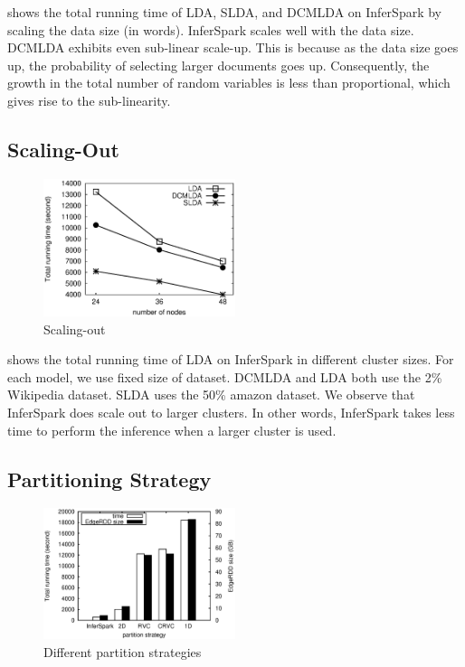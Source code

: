  shows the total running time of LDA, SLDA, and DCMLDA on InferSpark
by scaling the data size (in words).
InferSpark scales well with the data size.
DCMLDA exhibits even sub-linear scale-up. This is because as the data size goes up, 
the probability of selecting larger documents goes up. Consequently,
the growth in the total number of random variables is less than proportional, which gives rise
to the sub-linearity.

\subsection{Scaling-Out}

\begin{figure}[h]
	\centering
	\includegraphics[width=0.5\textwidth]{figs/exp_clustersize.eps}
	\caption{Scaling-out}
	\label{fig:scale-out}
\end{figure}


 shows the total running time of LDA on InferSpark in
different cluster sizes. For each model, we use fixed size of dataset.  DCMLDA
and LDA both use the 2\% Wikipedia dataset. SLDA uses the 50\% amazon dataset.
We observe that InferSpark does scale out to larger clusters. In other words,
InferSpark takes less time to perform the inference when a larger cluster is
used. 

\subsection{Partitioning Strategy}

\begin{figure}[h]\centering
	\includegraphics[width=0.5\textwidth]{figs/exp_partition_strategy.eps}
	\caption{Different partition strategies}
	\label{fig:exp_partition_strategy}
\end{figure}


